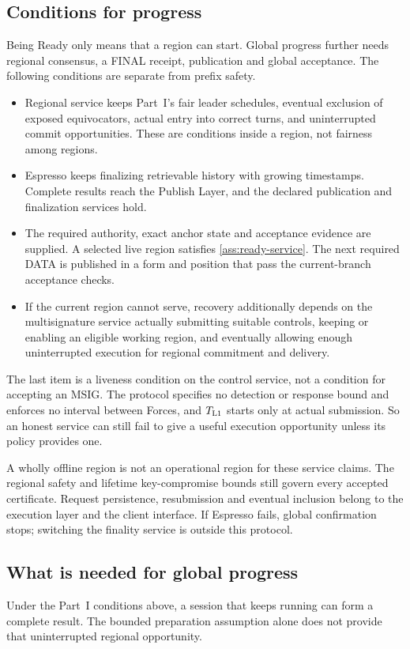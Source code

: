 \documentclass[11pt,a4paper]{article}
\newcounter{protocol}
\begin{document}
\subsection{Conditions for progress}
\label{sec:progress}
Being Ready only means that a region can start. Global progress further
needs regional consensus, a FINAL receipt, publication and global
acceptance. The following conditions are separate from prefix safety.
\begin{itemize}
\item Regional service keeps Part~I's fair leader schedules, eventual
exclusion of exposed equivocators, actual entry into correct turns, and
uninterrupted commit opportunities. These are conditions inside a region,
not fairness among regions.
\item Espresso keeps finalizing retrievable history with growing
timestamps. Complete results reach the Publish Layer, and the declared
publication and finalization services hold.
\item The required authority, exact anchor state and acceptance evidence
are supplied. A selected live region satisfies \cref{ass:ready-service}.
The next required DATA is published in a form and position that pass the
current-branch acceptance checks.
\item If the current region cannot serve, recovery additionally depends
on the multisignature service actually submitting suitable controls,
keeping or enabling an eligible working region, and eventually allowing
enough uninterrupted execution for regional commitment and delivery.
\end{itemize}
The last item is a liveness condition on the control service, not a
condition for accepting an MSIG. The protocol specifies no detection or
response bound and enforces no interval between Forces, and $T_{\rm L1}$
starts only at actual submission. So an honest service can still fail to
give a useful execution opportunity unless its policy provides one.

A wholly offline region is not an operational region for these service
claims. The regional safety and lifetime key-compromise bounds still
govern every accepted certificate. Request persistence, resubmission and
eventual inclusion belong to the execution layer and the client
interface. If Espresso fails, global confirmation stops; switching the
finality service is outside this protocol.

\subsection{What is needed for global progress}
\label{sec:global-progress}
Under the Part~I conditions above, a session that keeps running can form
a complete result. The bounded preparation assumption alone does not
provide that uninterrupted regional opportunity.
\end{document}
